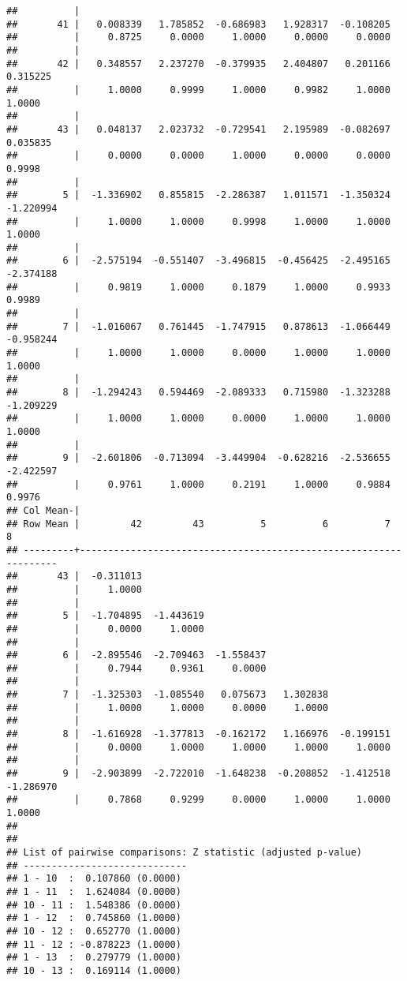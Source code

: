 \documentclass[12pt,]{article}
\begin{document}
\begin{verbatim}
##          |
##       41 |   0.008339   1.785852  -0.686983   1.928317  -0.108205
##          |     0.8725     0.0000     1.0000     0.0000     0.0000
##          |
##       42 |   0.348557   2.237270  -0.379935   2.404807   0.201166   0.315225
##          |     1.0000     0.9999     1.0000     0.9982     1.0000     1.0000
##          |
##       43 |   0.048137   2.023732  -0.729541   2.195989  -0.082697   0.035835
##          |     0.0000     0.0000     1.0000     0.0000     0.0000     0.9998
##          |
##        5 |  -1.336902   0.855815  -2.286387   1.011571  -1.350324  -1.220994
##          |     1.0000     1.0000     0.9998     1.0000     1.0000     1.0000
##          |
##        6 |  -2.575194  -0.551407  -3.496815  -0.456425  -2.495165  -2.374188
##          |     0.9819     1.0000     0.1879     1.0000     0.9933     0.9989
##          |
##        7 |  -1.016067   0.761445  -1.747915   0.878613  -1.066449  -0.958244
##          |     1.0000     1.0000     0.0000     1.0000     1.0000     1.0000
##          |
##        8 |  -1.294243   0.594469  -2.089333   0.715980  -1.323288  -1.209229
##          |     1.0000     1.0000     0.0000     1.0000     1.0000     1.0000
##          |
##        9 |  -2.601806  -0.713094  -3.449904  -0.628216  -2.536655  -2.422597
##          |     0.9761     1.0000     0.2191     1.0000     0.9884     0.9976
## Col Mean-|
## Row Mean |         42         43          5          6          7          8
## ---------+------------------------------------------------------------------
##       43 |  -0.311013
##          |     1.0000
##          |
##        5 |  -1.704895  -1.443619
##          |     0.0000     1.0000
##          |
##        6 |  -2.895546  -2.709463  -1.558437
##          |     0.7944     0.9361     0.0000
##          |
##        7 |  -1.325303  -1.085540   0.075673   1.302838
##          |     1.0000     1.0000     0.0000     1.0000
##          |
##        8 |  -1.616928  -1.377813  -0.162172   1.166976  -0.199151
##          |     0.0000     1.0000     1.0000     1.0000     1.0000
##          |
##        9 |  -2.903899  -2.722010  -1.648238  -0.208852  -1.412518  -1.286970
##          |     0.7868     0.9299     0.0000     1.0000     1.0000     1.0000
## 
## 
## List of pairwise comparisons: Z statistic (adjusted p-value)
## -----------------------------
## 1 - 10  :  0.107860 (0.0000)
## 1 - 11  :  1.624084 (0.0000)
## 10 - 11 :  1.548386 (0.0000)
## 1 - 12  :  0.745860 (1.0000)
## 10 - 12 :  0.652770 (1.0000)
## 11 - 12 : -0.878223 (1.0000)
## 1 - 13  :  0.279779 (1.0000)
## 10 - 13 :  0.169114 (1.0000)

\end{verbatim}
\end{document}
